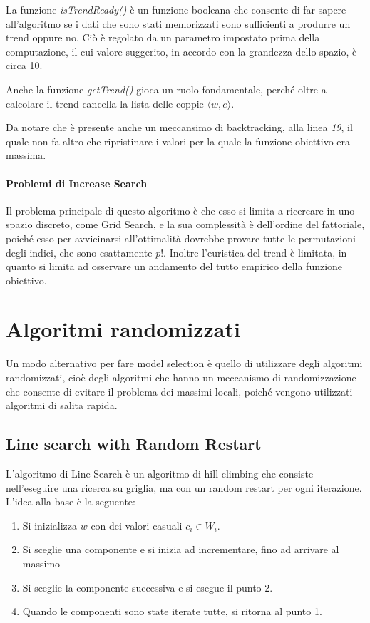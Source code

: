 La funzione \textit{isTrendReady()} è un funzione booleana
che consente di far sapere all'algoritmo se i dati che sono stati memorizzati
sono sufficienti a produrre un trend oppure no. Ciò è regolato da un
parametro impostato prima della computazione, il cui valore
suggerito, in accordo con la grandezza dello spazio, è circa 10.

Anche la funzione \textit{getTrend()} gioca un ruolo fondamentale,
perché oltre a calcolare il trend cancella la lista delle coppie
$\langle w, e\rangle$.

Da notare che è presente anche un meccansimo di backtracking,
alla linea \textit{19}, il quale non fa altro che ripristinare
i valori per la quale la funzione obiettivo era massima.

\paragraph{Problemi di Increase Search}
Il problema principale di questo algoritmo è che esso si limita a ricercare
in uno spazio discreto, come Grid Search, e la sua complessità è dell'ordine
del fattoriale, poiché esso per avvicinarsi all'ottimalità dovrebbe
provare tutte le permutazioni degli indici, che sono esattamente $p!$.
Inoltre l'euristica del trend è limitata, in quanto si limita
ad osservare un andamento del tutto empirico della funzione obiettivo.

\section{Algoritmi randomizzati}
Un modo alternativo per fare model selection è quello di utilizzare degli algoritmi randomizzati, cioè
degli algoritmi che hanno un meccanismo di randomizzazione che consente di evitare
il problema dei massimi locali, poiché vengono utilizzati algoritmi di salita rapida.

\subsection{Line search with Random Restart}
L'algoritmo di Line Search è un algoritmo di hill-climbing che consiste nell'eseguire
una ricerca su griglia, ma con un random restart per ogni iterazione.
L'idea alla base è la seguente:

\begin{enumerate}
	\item Si inizializza $w$ con dei valori casuali $c_i \in W_i$.
	\item Si sceglie una componente e si inizia ad incrementare, fino ad arrivare al massimo
	\item Si sceglie la componente successiva e si esegue il punto 2.
	\item Quando le componenti sono state iterate tutte, si ritorna al punto 1.
\end{enumerate}

